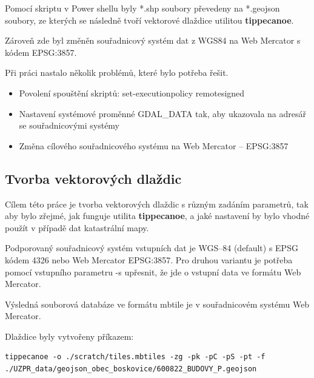\documentclass[12pt]{article}
\begin{document}
Pomocí skriptu v Power shellu byly *.shp soubory převedeny na *.geojson soubory, ze kterých se následně tvoří vektorové dlaždice utilitou \textbf{tippecanoe}.

Zároveň zde byl změněn souřadnicový systém dat z WGS84 na Web Mercator s kódem EPSG:3857.

Při práci nastalo několik problémů, které bylo potřeba řešit.
\begin{itemize}
	
	\item Povolení spouštění skriptů: set-executionpolicy remotesigned
	
	\item Nastavení systémové proměnné GDAL\_DATA tak, aby ukazovala na adresář se souřadnicovými systémy
	
	\item Změna cílového souřadnicového systému na Web Mercator -- EPSG:3857
	
\end{itemize}



\subsection{Tvorba vektorových dlaždic}
Cílem této práce je tvorba vektorových dlaždic s různým zadáním parametrů, tak aby bylo zřejmé, jak funguje utilita \textbf{tippecanoe}, a jaké nastavení by bylo vhodné použít v případě dat katastrální mapy.

Podporovaný souřadnicový systém vstupních dat je WGS--84 (default) s EPSG kódem 4326 nebo Web Mercator EPSG:3857. Pro druhou variantu je potřeba pomocí vstupního parametru -s upřesnit, že jde o vstupní data ve formátu Web Mercator.

Výsledná souborová databáze ve formátu mbtile je v souřadnicovém systému Web Mercator.

\vspace{0.5cm}
Dlaždice byly vytvořeny příkazem:

\begin{lstlisting}
tippecanoe -o ./scratch/tiles.mbtiles -zg -pk -pC -pS -pt -f
./UZPR_data/geojson_obec_boskovice/600822_BUDOVY_P.geojson
\end{lstlisting}
\end{document}
